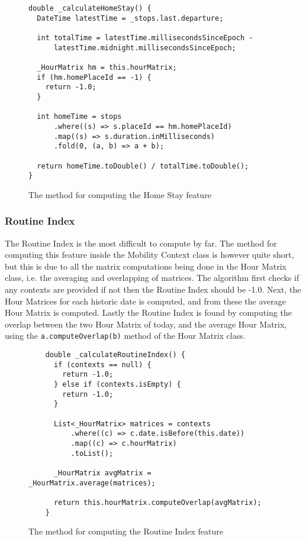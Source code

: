 \begin{figure}
    \centering
\begin{verbatim}
double _calculateHomeStay() {
  DateTime latestTime = _stops.last.departure;

  int totalTime = latestTime.millisecondsSinceEpoch -
      latestTime.midnight.millisecondsSinceEpoch;

  _HourMatrix hm = this.hourMatrix;
  if (hm.homePlaceId == -1) {
    return -1.0;
  }

  int homeTime = stops
      .where((s) => s.placeId == hm.homePlaceId)
      .map((s) => s.duration.inMilliseconds)
      .fold(0, (a, b) => a + b);

  return homeTime.toDouble() / totalTime.toDouble();
}
\end{verbatim}
    \caption{The method for computing the Home Stay feature}
    \label{fig:home-stay-code}
\end{figure}

\subsubsection{Routine Index}
The Routine Index is the most difficult to compute by far. The method for computing this feature inside the Mobility Context class is however quite short, but this is due to all the matrix computations being done in the Hour Matrix class, i.e. the averaging and overlapping of matrices. The algorithm first checks if any contexts are provided if not then the Routine Index should be -1.0. Next, the Hour Matrices for each historic date is computed, and from these the average Hour Matrix is computed. Lastly the Routine Index is found by computing the overlap between the two Hour Matrix of today, and the average Hour Matrix, using the \verb|a.computeOverlap(b)| method of the Hour Matrix class.

\begin{figure}
    \centering
    \begin{verbatim}
    double _calculateRoutineIndex() {
      if (contexts == null) {
        return -1.0;
      } else if (contexts.isEmpty) {
        return -1.0;
      }
    
      List<_HourMatrix> matrices = contexts
          .where((c) => c.date.isBefore(this.date))
          .map((c) => c.hourMatrix)
          .toList();
    
      _HourMatrix avgMatrix = _HourMatrix.average(matrices);
    
      return this.hourMatrix.computeOverlap(avgMatrix);
    }
    \end{verbatim}
    \caption{The method for computing the Routine Index feature}
    \label{fig:routine-index-code}
\end{figure}

